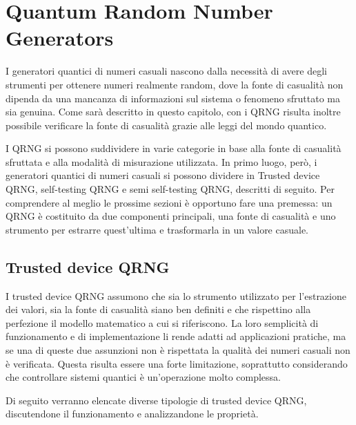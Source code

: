 \chapter{Quantum Random Number Generators}
I generatori quantici di numeri casuali nascono dalla necessità di avere degli strumenti per ottenere numeri realmente random, dove la fonte di casualità non dipenda da una mancanza di informazioni sul sistema o fenomeno sfruttato ma sia genuina. Come sarà descritto in questo capitolo, con i QRNG risulta inoltre possibile verificare la fonte di casualità grazie alle leggi del mondo quantico.

I QRNG si possono suddividere in varie categorie in base alla fonte di casualità sfruttata e alla modalità di misurazione utilizzata. In primo luogo, però, i generatori quantici di numeri casuali si possono dividere in Trusted device QRNG, self-testing QRNG e semi self-testing QRNG, descritti di seguito. Per comprendere al meglio le prossime sezioni è opportuno fare una premessa: un QRNG è costituito da due componenti principali, una fonte di casualità e uno strumento per estrarre quest'ultima e trasformarla in un valore casuale.

\section{Trusted device QRNG}
I trusted device QRNG assumono che sia lo strumento utilizzato per l'estrazione dei valori, sia la fonte di casualità siano ben definiti e che rispettino alla perfezione il modello matematico a cui si riferiscono. La loro semplicità di funzionamento e di implementazione li rende adatti ad applicazioni pratiche, ma se una di queste due assunzioni non è rispettata la qualità dei numeri casuali non è verificata. Questa risulta essere una forte limitazione, soprattutto considerando che controllare sistemi quantici è un'operazione molto complessa. 

Di seguito verranno elencate diverse tipologie di trusted device QRNG, discutendone il funzionamento e analizzandone le proprietà.

